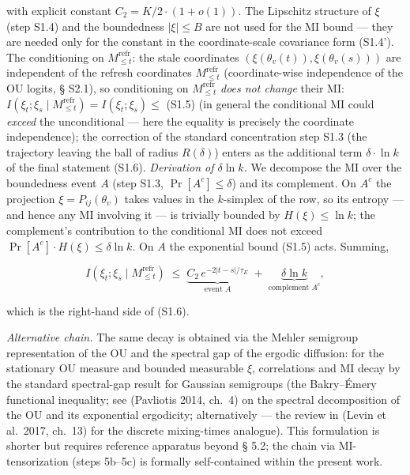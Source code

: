 \documentclass[pdflatex,sn-mathphys-ay]{sn-jnl}
\begin{document}
with explicit constant \(C_2 = K/2 \cdot (1 + o(1))\). The Lipschitz structure of \(\xi\) (step S1.4) and the boundedness \(|\xi| \le B\) are not used for the MI bound --- they are needed only for the constant in the coordinate-scale covariance form (S1.4'). The conditioning on \(M_{\le t}^{\text{refr}}\): the stale coordinates \((\xi(\theta_v(t)), \xi(\theta_v(s)))\) are independent of the refresh coordinates \(M_{\le t}^{\text{refr}}\) (coordinate-wise independence of the OU logits, § S2.1), so conditioning on \(M_{\le t}^{\text{refr}}\) \emph{does not change} their MI: \(I(\xi_t;\xi_s\mid M_{\le t}^{\text{refr}}) = I(\xi_t;\xi_s) \le\) (S1.5) (in general the conditional MI could \emph{exceed} the unconditional --- here the equality is precisely the coordinate independence); the correction of the standard concentration step S1.3 (the trajectory leaving the ball of radius \(R(\delta)\)) enters as the additional term \(\delta \cdot \ln k\) of the final statement (S1.6). \emph{Derivation of \(\delta\ln k\).} We decompose the MI over the boundedness event \(A\) (step S1.3, \(\Pr[A^c]\le\delta\)) and its complement. On \(A^c\) the projection \(\xi = P_{ij}(\theta_v)\) takes values in the \(k\)-simplex of the row, so its entropy --- and hence any MI involving it --- is trivially bounded by \(H(\xi) \le \ln k\); the complement's contribution to the conditional MI does not exceed \(\Pr[A^c]\cdot H(\xi) \le \delta\ln k\). On \(A\) the exponential bound (S1.5) acts. Summing,



\[I(\xi_t;\xi_s\mid M_{\le t}^{\text{refr}}) \;\le\; \underbrace{C_2\,e^{-2|t-s|/\tau_E}}_{\text{event }A} \;+\; \underbrace{\delta\ln k}_{\text{complement }A^c},\]



which is the right-hand side of (S1.6).



\emph{Alternative chain.} The same decay is obtained via the Mehler semigroup representation of the OU and the spectral gap of the ergodic diffusion: for the stationary OU measure and bounded measurable \(\xi\), correlations and MI decay by the standard spectral-gap result for Gaussian semigroups (the Bakry--Émery functional inequality; see (Pavliotis 2014, ch.~4) on the spectral decomposition of the OU and its exponential ergodicity; alternatively --- the review in (Levin et al.~2017, ch.~13) for the discrete mixing-times analogue). This formulation is shorter but requires reference apparatus beyond § 5.2; the chain via MI-tensorization (steps 5b--5c) is formally self-contained within the present work.
\end{document}
